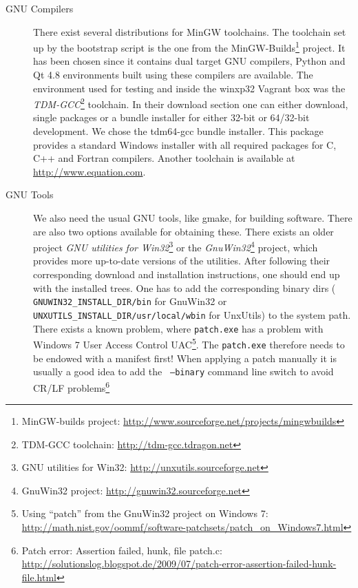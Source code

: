 \begin{description}
\item[GNU Compilers]  There exist several distributions  for MinGW toolchains.
  The  toolchain  set  up  by  the  bootstrap  script  is  the  one  from  the
  MinGW-Builds\footnote{MinGW-builds                                  project:
    \url{http://www.sourceforge.net/projects/mingwbuilds}}  project.   It  has
  been chosen since  it contains dual target GNU compilers,  Python and Qt 4.8
  environments  built using  these compilers  are available.   The environment
  used   for  testing   and   inside   the  winxp32   Vagrant   box  was   the
  \emph{TDM-GCC}\footnote{TDM-GCC toolchain: \url{http://tdm-gcc.tdragon.net}}
  toolchain.   In  their download  section  one  can either  download,  single
  packages or a  bundle installer for either 32-bit  or 64/32-bit development.
  We chose the  tdm64-gcc bundle installer.  This package  provides a standard
  Windows  installer  with  all  required  packages for  C,  C++  and  Fortran
  compilers. Another toolchain is available at \url{http://www.equation.com}.

\item[GNU Tools]  We also need the  usual GNU tools, like  gmake, for building
  software. There are  also two options available for  obtaining these.  There
  exists  an   older  project  \emph{GNU  utilities   for  Win32}\footnote{GNU
    utilities   for  Win32:   \url{http://unxutils.sourceforge.net}}  or   the
  \emph{GnuWin32}\footnote{GnuWin32                                   project:
    \url{http://gnuwin32.sourceforge.net}}   project,   which  provides   more
  up-to-date versions  of the utilities.  After  following their corresponding
  download and installation instructions, one should end up with the installed
  trees.    One   has   to   add   the   corresponding   binary   dirs   ({\tt
    GNUWIN32\_INSTALL\_DIR/bin}        for       GnuWin32        or       {\tt
    UNXUTILS\_INSTALL\_DIR/usr/local/wbin}   for  UnxUtils)   to  the   system
  path. There exists a known problem, where {\tt patch.exe} has a problem with
  Windows 7 User Access Control UAC\footnote{Using ``patch'' from the GnuWin32
    project                   on                  Windows                   7:
    \url{http://math.nist.gov/oommf/software-patchsets/patch_on_Windows7.html}}. The
  {\tt patch.exe}  therefore needs to be  endowed with a manifest  first! When
  applying  a patch  manually  it is  usually  a  good idea  to  add the  {\tt
    --binary}  command  line  switch to  avoid  CR/LF  problems\footnote{Patch
    error:       Assertion       failed,       hunk,       file       patch.c:
    \url{http://solutionslog.blogspot.de/2009/07/patch-error-assertion-failed-hunk-file.html}}


\end{description}
